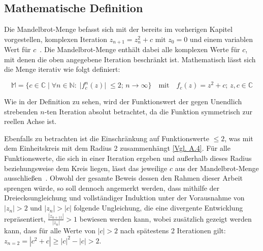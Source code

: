 \subsection{Mathematische Definition}\label{subsec:mathematical-definition}

Die Mandelbrot-Menge befasst sich mit der bereits im vorherigen Kapitel vorgestellen,
komplexen Iteration \(z_{n+1} = z_n^2 + c \text{ mit } z_0 = 0\) und einem variablen
Wert für \(c\)~\cite*[S.25]{schuh_fraktale_2017}.
Die Mandelbrot-Menge enthält dabei alle komplexen Werte für $c$, mit denen die
oben angegebene Iteration beschränkt ist.
Mathematisch lässt sich die Menge iterativ wie folgt definiert:

\begin{equation}\label{eq:mathematical-definition}
  \mathbb{M} = \{c \in \mathbb{C} \; |\;  \forall n \in \mathbb{N}:\; |f_c^n(z)|\; \leqslant 2;\, n \to \infty\}
  \quad
  \text{mit}
  \quad
  f_c(z) = z^2 + c;\, z,c \in \mathbb{C}
\end{equation}

Wie in der Definition zu sehen, wird der Funktionswert der
gegen Unendlich strebenden $n$-ten Iteration absolut betrachtet, da die
Funktion symmetrisch zur reellen Achse ist.

Ebenfalls zu betrachten ist die Einschränkung auf Funktionswerte $\leqslant 2$,
was mit dem Einheitskreis mit dem Radius 2 zusammenhängt
\hyperref[app:4]{[Vgl. A.4]}.
Für alle Funktionswerte, die sich in einer Iteration ergeben und außerhalb dieses Radius
beziehungsweise dem Kreis liegen, lässt das jeweilige $c$ aus der Mandelbrot-Menge
ausschließen~\cite{munafo_escape_1997}.
Obwohl der gesamte Beweis dessen den Rahmen dieser Arbeit sprengen würde,
so soll dennoch angemerkt werden, dass mithilfe der Dreiecksungleichung und
vollständiger Induktion unter der Vorausnahme von $|z_n| > 2 \text{ und } |z_n| > |c|$
folgende Ungleichung, die eine divergente Entwicklung repräsentiert,
$\frac{|z_{n+11}|}{|z_n|} > 1$ bewiesen werden kann, wobei zusätzlich gezeigt
werden kann, dass für alle Werte von $|c| > 2$ nach spätestens 2 Iterationen gilt:
$z_{n=2} = |c^2 + c| \geqslant |c|^2 - |c| > 2$.